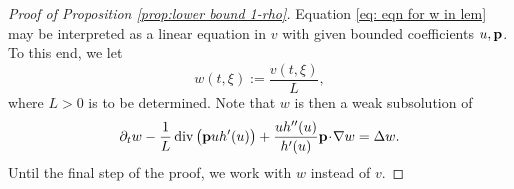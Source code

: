 \documentclass[11pt,a4paper,reqno]{amsart}
\theoremstyle{remark}
\theoremstyle{definition}
\numberwithin{equation}{section}
\DeclareMathOperator{\dv}{div}
\newcommand{\p}{{\bf p}}
\newcommand{\bxi}{\xi}
\begin{document}
\begin{proof}[Proof of Proposition \ref{prop:lower bound 1-rho}]
Equation \eqref{eq: eqn for w in lem} may be interpreted as a linear equation in $v$ with given bounded coefficients $u,\p$. To this end, we let 
    \begin{equation}\label{eq:w def at start of moser proof}
        w(t,\bxi) := \frac{v(t,\bxi)}{L}, 
    \end{equation}
    where $L>0$ is to be determined. Note that $w$ is then a weak subsolution of 
    \begin{equation}\label{eq: eqn for w in lem L rescaling}
    \partial_t w - \frac{1}{L} \dv\big( \p u h'(u) \big) + \frac{u h''(u)}{h'(u)}\p\!\cdot\!\nabla w = \Delta w. 
    \end{equation}
Until the final step of the proof, we work with $w$ instead of $v$. 

    \smallskip 


\end{proof}
\end{document}
